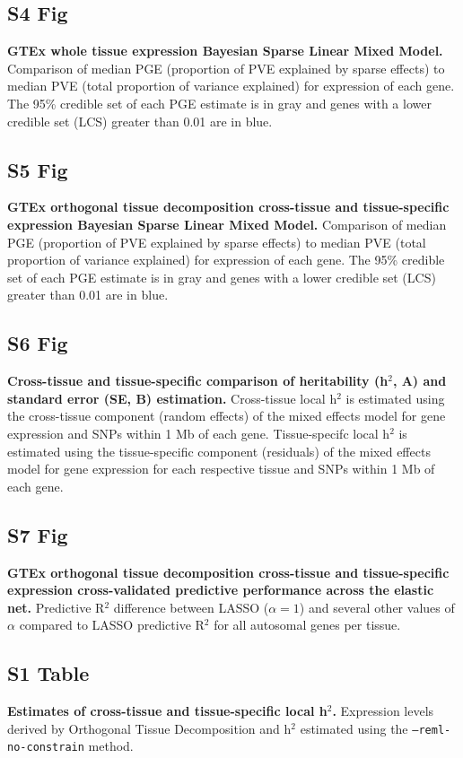 \documentclass[10pt,letterpaper]{article}
\begin{document}
\subsection*{S4 Fig}
\label{S4_Fig}
{\bf GTEx whole tissue expression Bayesian Sparse Linear Mixed Model.} Comparison of median PGE (proportion of PVE explained by sparse effects) to median PVE (total proportion of variance explained) for expression of each gene. The 95\% credible set of each PGE estimate is in gray and genes with a lower credible set (LCS) greater than 0.01 are in blue.

\subsection*{S5 Fig}
\label{S5_Fig}
{\bf GTEx orthogonal tissue decomposition cross-tissue and tissue-specific expression Bayesian Sparse Linear Mixed Model.} Comparison of median PGE (proportion of PVE explained by sparse effects) to median PVE (total proportion of variance explained) for expression of each gene. The 95\% credible set of each PGE estimate is in gray and genes with a lower credible set (LCS) greater than 0.01 are in blue.

\subsection*{S6 Fig}
\label{S6_Fig}
{\bf Cross-tissue and tissue-specific comparison of heritability (h$^2$, A) and standard error (SE, B) estimation.} Cross-tissue local h$^2$ is estimated using the cross-tissue component (random effects) of the mixed effects model for gene expression and SNPs within 1 Mb of each gene. Tissue-specifc local h$^2$ is estimated using the tissue-specific component (residuals) of the mixed effects model for gene expression for each respective tissue and SNPs within 1 Mb of each gene.

\subsection*{S7 Fig}
\label{S7_Fig}
{\bf GTEx orthogonal tissue decomposition cross-tissue and tissue-specific expression cross-validated predictive performance across the elastic net.} Predictive R$^2$ difference between LASSO ($\alpha = 1$) and several other values of $\alpha$ compared to LASSO predictive R$^2$ for all autosomal genes per tissue.

\subsection*{S1 Table}
\label{S1_Table}
{\bf Estimates of cross-tissue and tissue-specific local h$^2$.} Expression levels derived by Orthogonal Tissue Decomposition and h$^2$ estimated using the \texttt{--reml-no-constrain} method.
\end{document}
